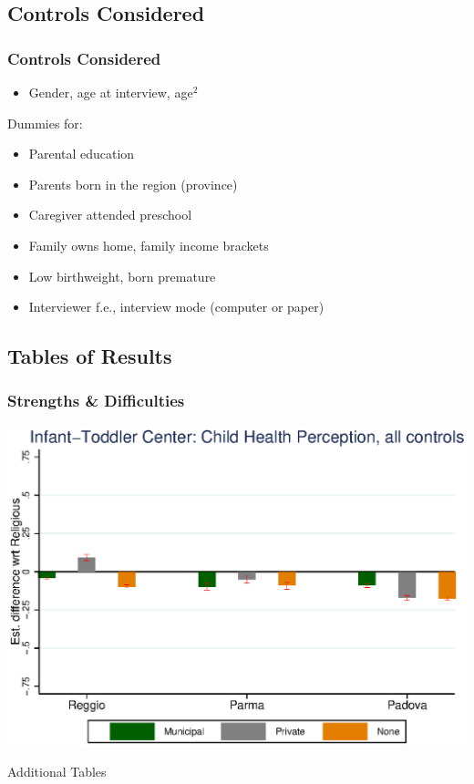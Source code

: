 \documentclass{beamer}
\begin{document}
\subsection{Controls Considered}


\begin{frame}
	\frametitle{Controls Considered}
	\begin{itemize}
		\item Gender, age at interview, age$^2$
	\end{itemize}
Dummies for: 
	\begin{itemize}
		\item Parental education
		\item Parents born in the region (province)
		\item Caregiver attended preschool
		\item Family owns home, family income brackets
		\item Low birthweight, born premature	
		\item Interviewer f.e., interview mode (computer or paper)
	\end{itemize}
\end{frame}


\subsection{Tables of Results}


\subsubsection{Strengths \& Difficulties}
\begin{frame}
\center
\includegraphics[scale=0.7]{../Output/graphs/CH_Asilo_Child_all.eps}
\end{frame}


\appendix

\begin{frame}
\center
\huge
Additional Tables
\end{frame}

\begin{frame}
\begin{tiny}
%

\end{tiny}
\end{frame}
\end{document}
